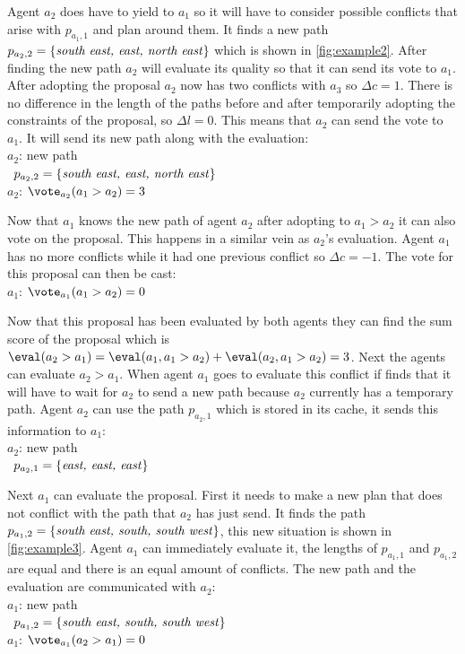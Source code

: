 Agent $a_2$ does have to yield to $a_1$ so it will have to consider possible 
conflicts that arise with $p_{a_1,1}$ and plan around them. It finds a new path 
$p_{a_2,2} = \{\text{\emph{south east, east, north east}}\}$ which is shown in 
\autoref{fig:example2}. After finding the new path $a_2$ will evaluate its 
quality so that it can send its vote to $a_1$. After adopting the proposal 
$a_2$ now has two conflicts with $a_3$ so $\Delta c = 1$. There is no 
difference in the length of the paths before and after temporarily adopting the 
constraints of the proposal, so $\Delta l = 0$. This means that $a_2$ can send 
the vote to $a_1$. It will send its new path along with the evaluation:
\\ \-\qquad $a_2$: new path
\\ \-\qquad\quad\,\; $p_{a_2,2} = \{\text{\emph{south east, east, north 
east}}\}$
\\ \-\qquad $a_2$: $\vote_{a_2}(a_1 > a_2) = 3$

Now that $a_1$ knows the new path of agent $a_2$ after adopting to $a_1 > a_2$
it can also vote on the proposal. This happens in a similar vein as $a_2$'s
evaluation. Agent $a_1$ has no more conflicts while it had one previous 
conflict so $\Delta c = -1$. The vote for this proposal can then be cast:
\\ \-\qquad $a_1$: $\vote_{a_1}(a_1 > a_2) = 0$

Now that this proposal has been evaluated by both agents they can find the sum
score of the proposal which is $\eval(a_2 > a_1) = \eval(a_1, a_1 > a_2) +
\eval(a_2, a_1 > a_2) = 3$. Next the agents can evaluate $a_2 > a_1$. When 
agent $a_1$ goes to evaluate this conflict if finds that it will have to wait 
for $a_2$ to send a new path because $a_2$ currently has a temporary path. 
Agent $a_2$ can use the path $p_{a_2,1}$ which is stored in its cache, it sends 
this information to $a_1$:
\\ \-\qquad $a_2$: new path
\\ \-\qquad\quad\,\; $p_{a_2,1} = \{\text{\emph{east, east, east}}\}$

Next $a_1$ can evaluate the proposal. First it needs to make a new plan that 
does not conflict with the path that $a_2$ has just send. It finds the path 
$p_{a_1,2} = \{\text{\emph{south east, south, south west}}\}$, this new 
situation is shown in \autoref{fig:example3}. Agent $a_1$ can immediately 
evaluate it, the lengths of $p_{a_1,1}$ and $p_{a_1,2}$ are equal and there is 
an equal amount of conflicts. The new path and the evaluation are communicated 
with $a_2$:
\\ \-\qquad $a_1$: new path
\\ \-\qquad\quad\,\; $p_{a_1,2} = \{\text{\emph{south east, south, south 
west}}\}$
\\ \-\qquad $a_1$: $\vote_{a_1}(a_2 > a_1) = 0$

